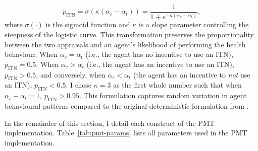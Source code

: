 \begin{equation}
    p_{\text{ITN}}=\sigma\left(\kappa(\alpha_c-\alpha_t)\right)=\frac{1}{1+e^{-\kappa(\alpha_c-\alpha_t)}},
\end{equation}
where $\sigma(\cdot)$ is the sigmoid function and $\kappa$ is a slope parameter controlling the steepness of the logistic curve. This transformation preserves the proportionality between the two appraisals and an agent's likelihood of performing the health behaviour: When $\alpha_c=\alpha_t$ (i.e., the agent has no incentive to use an ITN), $p_{\text{ITN}}=0.5$. When $\alpha_c>\alpha_t$ (i.e., the agent has an incentive to use an ITN), $p_{\text{ITN}}>0.5$, and conversely, when $\alpha_c<\alpha_t$ (the agent has an incentive to \textit{not} use an ITN), $p_{\text{ITN}}<0.5$. I chose $\kappa=3$ as the first whole number such that when $\alpha_c-\alpha_t=1$, $p_{\text{ITN}}>0.95$. This formulation captures random variation in agent behavioural patterns compared to the original deterministic formulation from \citet{kurchyna_seeing_2024}.

In the remainder of this section, I detail each construct of the PMT implementation. Table~\ref{tab:pmt-params} lists all parameters used in the PMT implementation.

